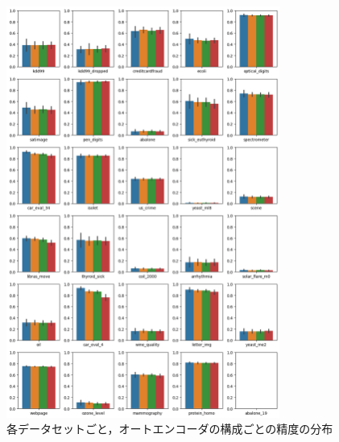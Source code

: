 \begin{figure}
    \centering
    \includegraphics[width=0.8\textwidth]{figures/result-dataset.png}
    \caption{各データセットごと，オートエンコーダの構成ごとの精度の分布}
    \label{fig:compare-dataset}
\end{figure}

